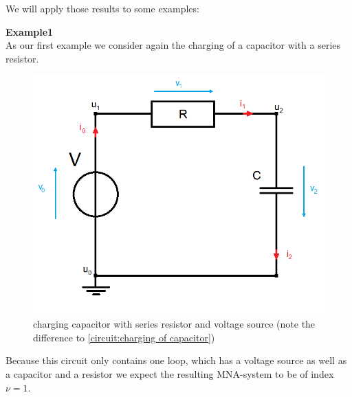 We will apply those results to some examples: 

\textbf{Example1} \label{ex:Index_Analysis} \\
	As our first example we consider again the charging of a capacitor with a series resistor.
	\begin{figure}[H]
		\centering
		\includegraphics[scale = 0.4]{pictures/Example1_simple_p2.png}
		\caption{charging capacitor with series resistor and voltage source (note the difference to \ref{circuit:charging of capacitor})} 
	\end{figure}
	Because this circuit only contains one loop, which has a voltage source as well as a capacitor and a resistor we expect the resulting MNA-system to be of index $\nu=1$. 
	

